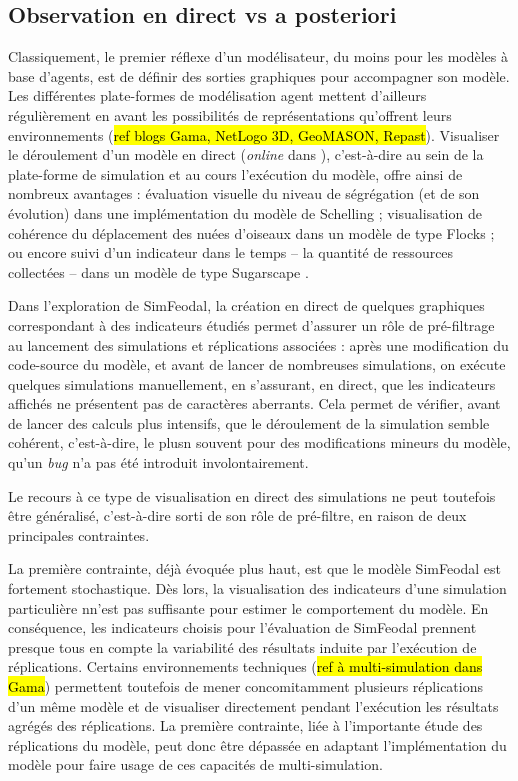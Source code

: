 	\subsection{Observation en direct vs a posteriori}\label{subsec:observation-a-posteriori}

	Classiquement, le premier réflexe d'un modélisateur, du moins pour les modèles à base d'agents, est de définir des sorties graphiques pour accompagner son modèle.
	Les différentes plate-formes de modélisation agent mettent d'ailleurs régulièrement en avant les possibilités de représentations qu'offrent leurs environnements (\hl{ref blogs Gama, NetLogo 3D, GeoMASON, Repast}).
	Visualiser le déroulement d'un modèle \og en direct\fg{} (\og \textit{online}\fg{} dans \cite{grignard_agent-based_2017}), c'est-à-dire au sein de la plate-forme de simulation et au cours l'exécution du modèle, offre ainsi de nombreux avantages : évaluation visuelle du niveau de ségrégation (et de son évolution) dans une implémentation du modèle de Schelling ; visualisation de cohérence du déplacement des nuées d'oiseaux dans un modèle de type \og Flocks\fg{} \autocite{reynolds_flocks_1987} ; ou encore suivi d'un indicateur dans le temps -- la quantité de ressources collectées -- dans un modèle de type \og Sugarscape\fg{} \autocite{epstein_growing_1996}.

	Dans l'exploration de SimFeodal, la création en direct de quelques graphiques correspondant à des indicateurs étudiés permet d'assurer un rôle de pré-filtrage au lancement des simulations et réplications associées : 
	après une modification du code-source du modèle, et avant de lancer de nombreuses simulations, on exécute quelques simulations \og manuellement\fg{}, en s'assurant, en direct, que les indicateurs affichés ne présentent pas de caractères aberrants.
	Cela permet de vérifier, avant de lancer des calculs plus intensifs, que le déroulement de la simulation semble cohérent, c'est-à-dire, le plusn souvent pour des modifications mineurs du modèle,  qu'un \textit{bug} n'a pas été introduit involontairement.
	
	Le recours à ce type de visualisation en direct des simulations ne peut toutefois être généralisé, c'est-à-dire sorti de son rôle de pré-filtre, en raison de deux principales contraintes.

	La première contrainte, déjà évoquée plus haut, est que le modèle SimFeodal est fortement stochastique.
	Dès lors, la visualisation des indicateurs d'une simulation particulière nn'est pas suffisante pour estimer le comportement du modèle.
	En conséquence, les indicateurs choisis pour l'évaluation de SimFeodal prennent presque tous en compte la variabilité des résultats induite par l'exécution de réplications.
	Certains environnements techniques (\hl{ref à multi-simulation dans Gama}) permettent toutefois de mener concomitamment plusieurs réplications d'un même modèle et de visualiser directement pendant l'exécution les résultats agrégés des réplications.
	La première contrainte, liée à l'importante étude des réplications du modèle, peut donc être dépassée en adaptant l'implémentation du modèle pour faire usage de ces capacités de multi-simulation.

